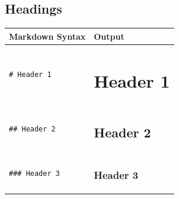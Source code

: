 \documentclass[
]{interact}
\newcounter{none} %
\begin{document}
\subsection{Headings}\label{headings}

{\def\LTcaptype{none} %
\begin{longtable}[]{@{}
  >{\raggedright\arraybackslash}p{}
  >{\raggedright\arraybackslash}p{}@{}}
\toprule\noalign{}
\begin{minipage}[b]{\linewidth}\raggedright
Markdown Syntax
\end{minipage} & \begin{minipage}[b]{\linewidth}\raggedright
Output
\end{minipage} \\
\midrule\noalign{}
\endhead
\bottomrule\noalign{}
\endlastfoot
\begin{minipage}[t]{\linewidth}\raggedright
\begin{verbatim}
# Header 1
\end{verbatim}
\end{minipage} & \begin{minipage}[t]{\linewidth}\raggedright
\section{Header 1}\label{header-1}
\end{minipage} \\
\begin{minipage}[t]{\linewidth}\raggedright
\begin{verbatim}
## Header 2
\end{verbatim}
\end{minipage} & \begin{minipage}[t]{\linewidth}\raggedright
\subsection{Header 2}\label{header-2}
\end{minipage} \\
\begin{minipage}[t]{\linewidth}\raggedright
\begin{verbatim}
### Header 3
\end{verbatim}
\end{minipage} & \begin{minipage}[t]{\linewidth}\raggedright
\subsubsection{Header 3}\label{header-3}
\end{minipage} \\
\end{longtable}
}
\end{document}
